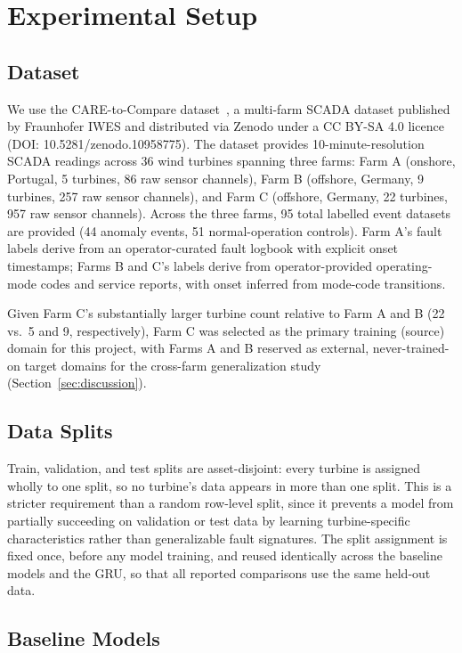 \documentclass[conference]{IEEEtran}
\begin{document}
\section{Experimental Setup}
\label{sec:experimental_setup}
\subsection{Dataset}
 
We use the CARE-to-Compare dataset~\cite{gueck2024}, a multi-farm SCADA
dataset published by Fraunhofer IWES and distributed via Zenodo under a
CC BY-SA 4.0 licence (DOI: 10.5281/zenodo.10958775). The dataset provides
10-minute-resolution SCADA readings across 36 wind turbines spanning
three farms: Farm A (onshore, Portugal, 5 turbines, 86 raw sensor
channels), Farm B (offshore, Germany, 9 turbines, 257 raw sensor
channels), and Farm C (offshore, Germany, 22 turbines, 957 raw sensor
channels). Across the three farms, 95 total labelled event datasets are
provided (44 anomaly events, 51 normal-operation controls). Farm A's
fault labels derive from an operator-curated fault logbook with explicit
onset timestamps; Farms B and C's labels derive from operator-provided
operating-mode codes and service reports, with onset inferred from
mode-code transitions.
 
Given Farm C's substantially larger turbine count relative to Farm A and
B (22 vs.\ 5 and 9, respectively), Farm C was selected as the primary
training (source) domain for this project, with Farms A and B reserved
as external, never-trained-on target domains for the cross-farm
generalization study (Section~\ref{sec:discussion}).
 
\subsection{Data Splits}
 
Train, validation, and test splits are asset-disjoint: every turbine is
assigned wholly to one split, so no turbine's data appears in more than
one split. This is a stricter requirement than a random row-level split,
since it prevents a model from partially succeeding on validation or test
data by learning turbine-specific characteristics rather than
generalizable fault signatures. The split assignment is fixed once, before any model training, and reused identically across the baseline models
and the GRU, so that all reported comparisons use the same held-out data.
 
\subsection{Baseline Models}
 
\end{document}

